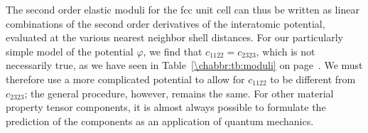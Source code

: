 The second order elastic moduli for the fcc unit cell can thus be written as linear combinations of the second order derivatives of the interatomic potential, evaluated at the various nearest neighbor shell distances.  For our particularly simple model of the potential $\varphi$, we find that $c_{1122} = c_{2323}$, which is not necessarily true, as we have seen in Table~\ref{\chabbr:tb:moduli} on page~\pageref{\chabbr:tb:moduli}.  We must therefore use a more complicated potential to allow for $c_{1122}$ to be different from $c_{2323}$; the general procedure, however, remains the same.  For other material property tensor components, it is almost always possible to formulate the prediction of the components as an application of quantum mechanics.



